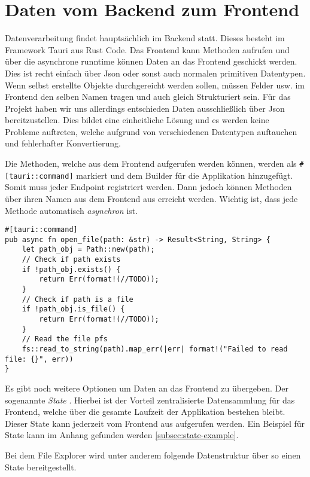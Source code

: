 \section{Daten vom Backend zum Frontend}\label{sec:Daten vom Backend zum Frontend}

Datenverarbeitung findet hauptsächlich im Backend statt. Dieses besteht im Framework Tauri \cite{tauri2025} aus Rust Code.
Das Frontend kann Methoden aufrufen und über die asynchrone runntime können Daten an das Frontend geschickt werden. Dies ist recht
einfach über Json oder sonst auch normalen primitiven Datentypen. Wenn selbst erstellte Objekte durchgereicht werden sollen,
müssen Felder usw. im Frontend den selben Namen tragen und auch gleich Strukturiert sein. Für das Projekt haben wir uns allerdings
entschieden Daten ausschließlich über Json bereitzustellen. Dies bildet eine einheitliche Lösung und es werden keine Probleme
auftreten, welche aufgrund von verschiedenen Datentypen auftauchen und fehlerhafter Konvertierung.

Die Methoden, welche aus dem Frontend aufgerufen werden können, werden als \verb|#[tauri::command]| markiert und dem Builder für
die Applikation hinzugefügt. Somit muss jeder Endpoint registriert werden. Dann jedoch können Methoden über ihren Namen aus dem
Frontend aus erreicht werden. Wichtig ist, dass jede Methode automatisch \textit{asynchron} ist.


\begin{verbatim}
#[tauri::command]
pub async fn open_file(path: &str) -> Result<String, String> {
    let path_obj = Path::new(path);
    // Check if path exists
    if !path_obj.exists() {
        return Err(format!(//TODO));
    }
    // Check if path is a file
    if !path_obj.is_file() {
        return Err(format!(//TODO));
    }
    // Read the file pfs
    fs::read_to_string(path).map_err(|err| format!("Failed to read file: {}", err))
}
\end{verbatim}

Es gibt noch weitere Optionen um Daten an das Frontend zu übergeben. Der sogenannte \textit{State} \cite{tauri_state_management}.
Hierbei ist der Vorteil zentralisierte Datensammlung für das Frontend, welche über die gesamte Laufzeit der Applikation bestehen
bleibt. Dieser State kann jederzeit vom Frontend aus aufgerufen werden. Ein Beispiel für State kann im Anhang gefunden werden
\ref{subsec:state-example}.

Bei dem File Explorer wird unter anderem folgende Datenstruktur über so einen State bereitgestellt.

